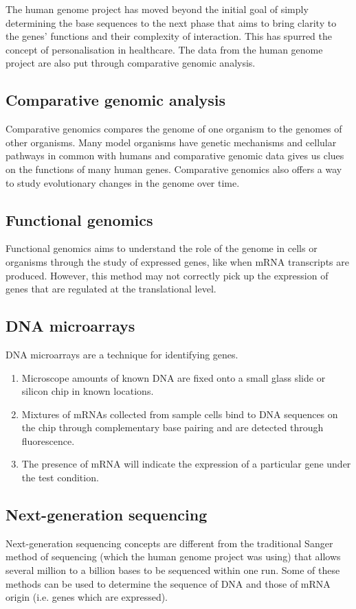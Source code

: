 \documentclass[11pt]{article}
\begin{document}
The human genome project has moved beyond the initial goal of simply determining the base sequences to the next phase that aims to bring clarity to the genes' functions and their complexity of interaction. This has spurred the concept of personalisation in healthcare. The data from the human genome project are also put through comparative genomic analysis.

\subsection{Comparative genomic analysis}
\label{sec:orgbe45ce8}
Comparative genomics compares the genome of one organism to the genomes of other organisms. Many model organisms have genetic mechanisms and cellular pathways in common with humans and comparative genomic data gives us clues on the functions of many human genes. Comparative genomics also offers a way to study evolutionary changes in the genome over time.

\subsection{Functional genomics}
\label{sec:orgb9236d0}
Functional genomics aims to understand the role of the genome in cells or organisms through the study of expressed genes, like when mRNA transcripts are produced. However, this method may not correctly pick up the expression of genes that are regulated at the translational level.

\subsection{DNA microarrays}
\label{sec:org2f5f3da}
DNA microarrays are a technique for identifying genes.
\begin{enumerate}
\item Microscope amounts of known DNA are fixed onto a small glass slide or silicon chip in known locations.
\item Mixtures of mRNAs collected from sample cells bind to DNA sequences on the chip through complementary base pairing and are detected through fluorescence.
\item The presence of mRNA will indicate the expression of a particular gene under the test condition.
\end{enumerate}

\subsection{Next-generation sequencing}
\label{sec:org9dd78fc}
Next-generation sequencing concepts are different from the traditional Sanger method of sequencing (which the human genome project was using) that allows several million to a billion bases to be sequenced within one run. Some of these methods can be used to determine the sequence of DNA and those of mRNA origin (i.e. genes which are expressed).
\end{document}
